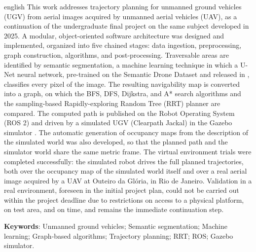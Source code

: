 \documentclass[
    12pt,
    openright,
    oneside,
    a4paper,
    english,
    brazil
]{abntex2}
\begin{document}
\begin{resumo}[Abstract]
\begin{otherlanguage*}{english}
This work addresses trajectory planning for unmanned ground vehicles (UGV) from aerial images acquired by unmanned aerial vehicles (UAV), as a continuation of the undergraduate final project on the same subject developed in 2025. A modular, object-oriented software architecture was designed and implemented, organized into five chained stages: data ingestion, preprocessing, graph construction, algorithms, and post-processing. Traversable areas are identified by semantic segmentation, a machine learning technique in which a U-Net neural network, pre-trained on the Semantic Drone Dataset \cite{drone_dataset} and released in \cite{junior2024_models}, classifies every pixel of the image. The resulting navigability map is converted into a graph, on which the BFS, DFS, Dijkstra, and A* search algorithms and the sampling-based Rapidly-exploring Random Tree (RRT) planner are compared. The computed path is published on the Robot Operating System (ROS 2) \cite{quigley2009} and driven by a simulated UGV (Clearpath Jackal) in the Gazebo simulator \cite{koenig2004}. The automatic generation of occupancy maps from the description of the simulated world was also developed, so that the planned path and the simulator world share the same metric frame. The virtual environment trials were completed successfully: the simulated robot drives the full planned trajectories, both over the occupancy map of the simulated world itself and over a real aerial image acquired by a UAV at Outeiro da Glória, in Rio de Janeiro. Validation in a real environment, foreseen in the initial project plan, could not be carried out within the project deadline due to restrictions on access to a physical platform, on test area, and on time, and remains the immediate continuation step.

\textbf{Keywords}: Unmanned ground vehicles; Semantic segmentation; Machine learning; Graph-based algorithms; Trajectory planning; RRT; ROS; Gazebo simulator.
\end{otherlanguage*}
\end{resumo}

\listoffigures*
\cleardoublepage

\listoftables*
\cleardoublepage
\end{document}
